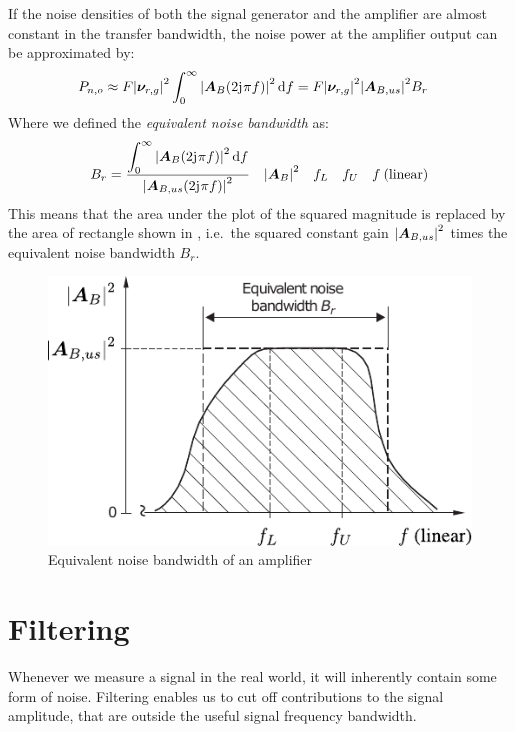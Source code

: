 If the noise densities of both the signal generator and the amplifier are almost constant in the transfer bandwidth, the noise power at the amplifier output can be approximated by:
\begin{align}
  P_{n,o} &\approx F\abs{\bm{\nu}_{r,g}}^2\int_0^\infty \abs{\bm{A}_B(2\mathrm{j}\mkern1mu\pi f)}^2\dd{f} = F\abs{\bm{\nu}_{r,g}}^2\abs{\bm{A}_{B,us}}^2 B_r
\end{align}
Where we defined the \emph{equivalent noise bandwidth} as:
\begin{align}
  B_r = \frac{\displaystyle\int_0^\infty \abs{\bm{A}_B(2\mathrm{j}\mkern1mu\pi f)}^2\dd{f}}{\abs{\bm{A}_{B,us}(2\mathrm{j}\mkern1mu\pi f)}^2} \quad\abs{\bm{A}_B}^2\quad f_L\quad f_U \quad f\:\text{(linear)}
\end{align}
This means that the area under the plot of the squared magnitude is replaced by the area of rectangle shown in , i.e.\ the squared constant gain $\abs{\bm{A}_{B,us}}^2$ times the equivalent noise bandwidth $B_r$.

\begin{figure}[htb!]
  \centering
  \includegraphics[scale=1]{figures/electronics/op_amp/equivalent_noise_bandwidth}
  \caption[Equivalent Noise Bandwidth of an Amplifier]{Equivalent noise bandwidth of an amplifier \cite{Tietze2008EC}%
    \label{fig:equivalent_noise_bandwidth}}
\end{figure}



\section{Filtering}

Whenever we measure a signal in the real world, it will inherently contain some form of noise. Filtering enables us to cut off contributions to the signal amplitude, that are outside the useful signal frequency bandwidth.


